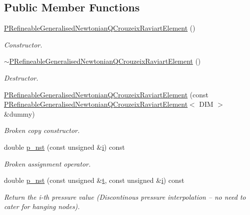 \subsection*{Public Member Functions}
\begin{DoxyCompactItemize}
\item 
\hyperlink{classoomph_1_1PRefineableGeneralisedNewtonianQCrouzeixRaviartElement_a106d51c7303c556be85aff5b3bab6196}{P\+Refineable\+Generalised\+Newtonian\+Q\+Crouzeix\+Raviart\+Element} ()
\begin{DoxyCompactList}\small\item\em Constructor. \end{DoxyCompactList}\item 
\hyperlink{classoomph_1_1PRefineableGeneralisedNewtonianQCrouzeixRaviartElement_a6a421a60c83a76fabaf44495d104a3c5}{$\sim$\+P\+Refineable\+Generalised\+Newtonian\+Q\+Crouzeix\+Raviart\+Element} ()
\begin{DoxyCompactList}\small\item\em Destructor. \end{DoxyCompactList}\item 
\hyperlink{classoomph_1_1PRefineableGeneralisedNewtonianQCrouzeixRaviartElement_afbfc1a7216ace17755c948281472c377}{P\+Refineable\+Generalised\+Newtonian\+Q\+Crouzeix\+Raviart\+Element} (const \hyperlink{classoomph_1_1PRefineableGeneralisedNewtonianQCrouzeixRaviartElement}{P\+Refineable\+Generalised\+Newtonian\+Q\+Crouzeix\+Raviart\+Element}$<$ D\+IM $>$ \&dummy)
\begin{DoxyCompactList}\small\item\em Broken copy constructor. \end{DoxyCompactList}\item 
double \hyperlink{classoomph_1_1PRefineableGeneralisedNewtonianQCrouzeixRaviartElement_a2aa0981d2fccc40fe3b94763901ff844}{p\+\_\+nst} (const unsigned \&\hyperlink{cfortran_8h_adb50e893b86b3e55e751a42eab3cba82}{i}) const
\begin{DoxyCompactList}\small\item\em Broken assignment operator. \end{DoxyCompactList}\item 
double \hyperlink{classoomph_1_1PRefineableGeneralisedNewtonianQCrouzeixRaviartElement_a2c14443dfbea1eedbafd06caca166dd9}{p\+\_\+nst} (const unsigned \&\hyperlink{cfortran_8h_af6f0bd3dc13317f895c91323c25c2b8f}{t}, const unsigned \&\hyperlink{cfortran_8h_adb50e893b86b3e55e751a42eab3cba82}{i}) const
\begin{DoxyCompactList}\small\item\em Return the i-\/th pressure value (Discontinous pressure interpolation -- no need to cater for hanging nodes). \end{DoxyCompactList}\item 

\end{DoxyCompactItemize}
